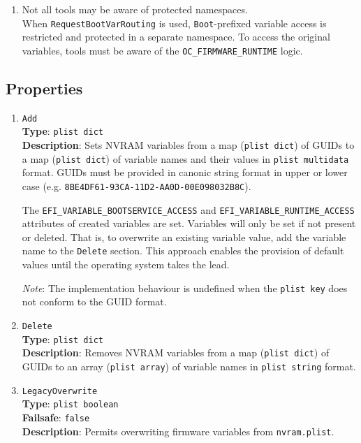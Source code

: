 \documentclass[]{article}
\makeatletter
\renewcommand{\label}[1]{%
\zref@wrapper@immediate{\oldlabel{#1}}}  %
\makeatother
\begin{document}
\begin{enumerate}
\item Not all tools may be aware of protected namespaces.\\
  When \texttt{RequestBootVarRouting} is used, \texttt{Boot}-prefixed variable access
  is restricted and protected in a separate namespace. To access the original variables,
  tools must be aware of the \texttt{OC\_FIRMWARE\_RUNTIME} logic.
\end{enumerate}

\subsection{Properties}\label{nvramprops}

\begin{enumerate}

\item
  \texttt{Add}\\
  \textbf{Type}: \texttt{plist\ dict}\\
  \textbf{Description}: Sets NVRAM variables from a map (\texttt{plist\ dict})
  of GUIDs to a map (\texttt{plist\ dict}) of variable names and their values
  in \texttt{plist\ multidata} format. GUIDs must be provided in canonic string
  format in upper or lower case (e.g. \texttt{8BE4DF61-93CA-11D2-AA0D-00E098032B8C}).

  The \texttt{EFI\_VARIABLE\_BOOTSERVICE\_ACCESS} and \texttt{EFI\_VARIABLE\_RUNTIME\_ACCESS}
  attributes of created variables are set. Variables will only be set if not present or deleted.
  That is, to overwrite an existing variable value, add the variable name to the \texttt{Delete} section.
  This approach enables the provision of default values until the operating system takes the lead.

  \emph{Note}: The implementation behaviour is undefined when the \texttt{plist\ key}
  does not conform to the GUID format.

\item
  \texttt{Delete}\\
  \textbf{Type}: \texttt{plist\ dict}\\
  \textbf{Description}: Removes NVRAM variables from a map (\texttt{plist\ dict})
  of GUIDs to an array (\texttt{plist\ array}) of variable names in
  \texttt{plist\ string} format.

\item
  \texttt{LegacyOverwrite}\\
  \textbf{Type}: \texttt{plist\ boolean}\\
  \textbf{Failsafe}: \texttt{false}\\
  \textbf{Description}: Permits overwriting firmware variables from \texttt{nvram.plist}.


\end{enumerate}
\end{document}
